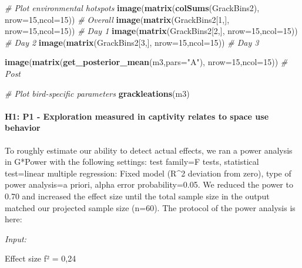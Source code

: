 \documentclass[
]{article}
\newenvironment{Shaded}{\begin{snugshade}}{\end{snugshade}}
\newcommand{\CommentTok}[1]{\textcolor[rgb]{0.56,0.35,0.01}{\textit{#1}}}
\newcommand{\DataTypeTok}[1]{\textcolor[rgb]{0.13,0.29,0.53}{#1}}
\newcommand{\DecValTok}[1]{\textcolor[rgb]{0.00,0.00,0.81}{#1}}
\newcommand{\KeywordTok}[1]{\textcolor[rgb]{0.13,0.29,0.53}{\textbf{#1}}}
\newcommand{\NormalTok}[1]{#1}
\newcommand{\StringTok}[1]{\textcolor[rgb]{0.31,0.60,0.02}{#1}}
\begin{document}
\begin{Shaded}
\begin{Highlighting}[]
\CommentTok{# Plot environmental hotspots}
\KeywordTok{image}\NormalTok{(}\KeywordTok{matrix}\NormalTok{(}\KeywordTok{colSums}\NormalTok{(GrackBins2), }\DataTypeTok{nrow=}\DecValTok{15}\NormalTok{,}\DataTypeTok{ncol=}\DecValTok{15}\NormalTok{)) }\CommentTok{# Overall}
\KeywordTok{image}\NormalTok{(}\KeywordTok{matrix}\NormalTok{(GrackBins2[}\DecValTok{1}\NormalTok{,], }\DataTypeTok{nrow=}\DecValTok{15}\NormalTok{,}\DataTypeTok{ncol=}\DecValTok{15}\NormalTok{)) }\CommentTok{# Day 1}
\KeywordTok{image}\NormalTok{(}\KeywordTok{matrix}\NormalTok{(GrackBins2[}\DecValTok{2}\NormalTok{,], }\DataTypeTok{nrow=}\DecValTok{15}\NormalTok{,}\DataTypeTok{ncol=}\DecValTok{15}\NormalTok{)) }\CommentTok{# Day 2}
\KeywordTok{image}\NormalTok{(}\KeywordTok{matrix}\NormalTok{(GrackBins2[}\DecValTok{3}\NormalTok{,], }\DataTypeTok{nrow=}\DecValTok{15}\NormalTok{,}\DataTypeTok{ncol=}\DecValTok{15}\NormalTok{)) }\CommentTok{# Day 3}

\KeywordTok{image}\NormalTok{(}\KeywordTok{matrix}\NormalTok{(}\KeywordTok{get_posterior_mean}\NormalTok{(m3,}\DataTypeTok{pars=}\StringTok{"A"}\NormalTok{), }\DataTypeTok{nrow=}\DecValTok{15}\NormalTok{,}\DataTypeTok{ncol=}\DecValTok{15}\NormalTok{)) }\CommentTok{# Post}

\CommentTok{# Plot bird-specific parameters}
\KeywordTok{grackleations}\NormalTok{(m3)}
\end{Highlighting}
\end{Shaded}

\hypertarget{h1-p1---exploration-measured-in-captivity-relates-to-space-use-behavior}{%
\paragraph{H1: P1 - Exploration measured in captivity relates to space
use
behavior}\label{h1-p1---exploration-measured-in-captivity-relates-to-space-use-behavior}}

To roughly estimate our ability to detect actual effects, we ran a power
analysis in G*Power with the following settings: test family=F tests,
statistical test=linear multiple regression: Fixed model (R\^{}2
deviation from zero), type of power analysis=a priori, alpha error
probability=0.05. We reduced the power to 0.70 and increased the effect
size until the total sample size in the output matched our projected
sample size (n=60). The protocol of the power analysis is here:

\emph{Input:}

Effect size f² = 0,24
\end{document}
